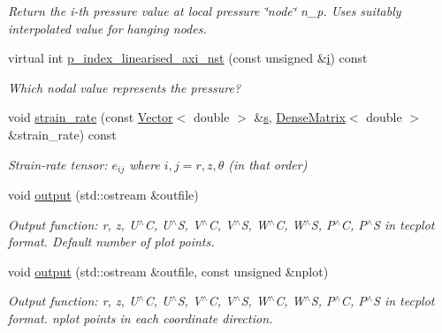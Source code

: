 \begin{DoxyCompactItemize}
\begin{DoxyCompactList}\small\item\em Return the i-\/th pressure value at local pressure \char`\"{}node\char`\"{} n\+\_\+p. Uses suitably interpolated value for hanging nodes. \end{DoxyCompactList}\item 
virtual int \hyperlink{classoomph_1_1LinearisedAxisymmetricNavierStokesEquations_af4828bf6fb5dbd8ff92e159676460d49}{p\+\_\+index\+\_\+linearised\+\_\+axi\+\_\+nst} (const unsigned \&\hyperlink{cfortran_8h_adb50e893b86b3e55e751a42eab3cba82}{i}) const
\begin{DoxyCompactList}\small\item\em Which nodal value represents the pressure? \end{DoxyCompactList}\item 
void \hyperlink{classoomph_1_1LinearisedAxisymmetricNavierStokesEquations_afe0044e617d78978d9d11f46eff31eb5}{strain\+\_\+rate} (const \hyperlink{classoomph_1_1Vector}{Vector}$<$ double $>$ \&\hyperlink{cfortran_8h_ab7123126e4885ef647dd9c6e3807a21c}{s}, \hyperlink{classoomph_1_1DenseMatrix}{Dense\+Matrix}$<$ double $>$ \&strain\+\_\+rate) const
\begin{DoxyCompactList}\small\item\em Strain-\/rate tensor\+: $ e_{ij} $ where $ i,j = r,z,\theta $ (in that order) \end{DoxyCompactList}\item 
void \hyperlink{classoomph_1_1LinearisedAxisymmetricNavierStokesEquations_a70e8f2426b53160afabe2f6dce78b920}{output} (std\+::ostream \&outfile)
\begin{DoxyCompactList}\small\item\em Output function\+: r, z, U$^\wedge$C, U$^\wedge$S, V$^\wedge$C, V$^\wedge$S, W$^\wedge$C, W$^\wedge$S, P$^\wedge$C, P$^\wedge$S in tecplot format. Default number of plot points. \end{DoxyCompactList}\item 
void \hyperlink{classoomph_1_1LinearisedAxisymmetricNavierStokesEquations_af91220377d90bc7506327e4f1de9e42a}{output} (std\+::ostream \&outfile, const unsigned \&nplot)
\begin{DoxyCompactList}\small\item\em Output function\+: r, z, U$^\wedge$C, U$^\wedge$S, V$^\wedge$C, V$^\wedge$S, W$^\wedge$C, W$^\wedge$S, P$^\wedge$C, P$^\wedge$S in tecplot format. nplot points in each coordinate direction. \end{DoxyCompactList}\item 

\end{DoxyCompactItemize}
